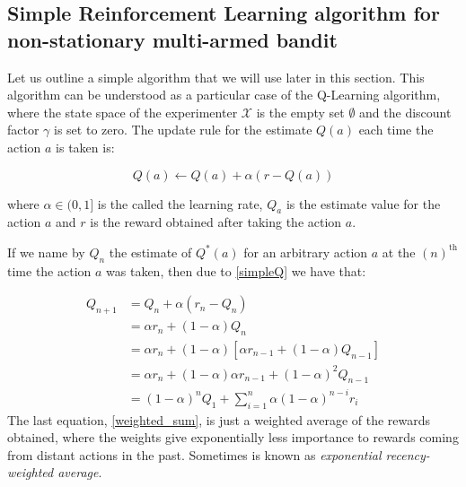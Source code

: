 \documentclass[11pt,a4paper,twoside]{report}
\newcommand{\+}{\textnormal{+} }
\theoremstyle{definition}
\numberwithin{equation}{chapter}
\begin{document}
\subsection{Simple Reinforcement Learning algorithm for non-stationary
multi-armed bandit} \label{SimpleRL}

Let us outline a simple algorithm that we will use later in this section. This
algorithm can be understood as a particular case of the Q-Learning algorithm,
where the state space of the experimenter $\mathcal{X}$ is the empty set
$\emptyset$ and the discount factor $\gamma$ is set to zero. The update rule for
the estimate $Q(a)$ each time the action $a$ is taken is:

\begin{equation}
  Q(a) \leftarrow Q(a) + \alpha \left( r - Q(a) \right)
  \label{simpleQ}
\end{equation}

where $\alpha \in (0,1]$ is the called the learning rate, $Q_{a}$ is the
estimate value for the action $a$ and $r$ is the reward obtained after taking
the action $a$.

If we name by $Q_n$ the estimate of $Q^*(a)$ for an arbitrary action $a$ at the
 $(n)^\text{th}$ time the action $a$ was taken, then due to \eqref{simpleQ} we
 have that:

 \begin{align}
  Q_{n+1} &=Q_{n}+\alpha\left(r_{n}-Q_{n}\right) \\
  &=\alpha r_{n}+(1-\alpha) Q_{n} \\
  &=\alpha r_{n}+(1-\alpha)\left[\alpha r_{n-1}+(1-\alpha) Q_{n-1}\right] \\
  &=\alpha r_{n}+(1-\alpha) \alpha r_{n-1}+(1-\alpha)^{2} Q_{n-1} \\
  &=(1-\alpha)^{n} Q_{1}+\sum_{i=1}^{n} \alpha(1-\alpha)^{n-i} r_{i}
  \label{weighted_sum}
  \end{align}
The last equation, \eqref{weighted_sum}, is just a weighted average of the
rewards obtained, where the weights give exponentially less importance to 
rewards coming from distant actions in the past. Sometimes is known as \textit{
  exponential recency-weighted average}.
\end{document}
